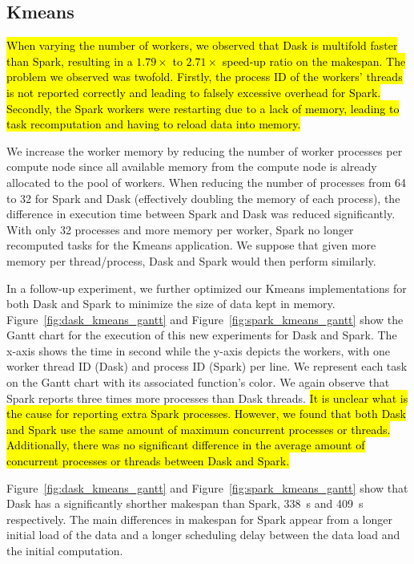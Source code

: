 \documentclass[AMA,STIX1COL]{WileyNJD-v2}
\newcommand{\HL}[1]{\hl{#1}}
\begin{document}
\subsection{Kmeans}
\HL{
	When varying the number of workers, we observed that Dask is multifold faster
	than Spark, resulting in a $1.79\times$ to $2.71\times$ speed-up ratio on the makespan.
	The problem we observed was twofold.
	Firstly, the process ID of the workers' threads is not reported correctly and 
	leading to falsely excessive overhead for Spark.
	Secondly, the Spark workers were restarting due to a lack of memory, leading 
	to task recomputation and having to reload data into memory.
}
							
We increase the worker memory by reducing the number of worker processes per
compute node since all available memory from the compute node is already allocated to the pool of workers.
When reducing the number of processes from 64 to 32 for Spark and Dask 
(effectively doubling the memory of each process), the difference in execution time between Spark and Dask was reduced significantly.
With only 32 processes and more memory per worker, Spark no longer recomputed tasks for the Kmeans application.
We suppose that given more memory per thread/process, Dask and Spark would then perform similarly.
							
In a follow-up experiment, we further optimized our Kmeans implementations for both Dask and Spark to minimize the size of data kept in memory.
Figure~{\ref{fig:dask_kmeans_gantt}} and Figure~{\ref{fig:spark_kmeans_gantt}} show the Gantt chart for the execution
of this new experiments for Dask and Spark.
The x-axis shows the time in second while the y-axis depicts the workers, with 
one worker thread ID (Dask) and process ID (Spark) per line.
We represent each task on the Gantt chart with its associated function's color.
We again observe that Spark reports three times more processes than Dask threads.
\HL{
	It is unclear what is the cause for reporting extra Spark processes.
	However, we found that both Dask and Spark use the same 
	amount of maximum concurrent processes or threads.
	Additionally, there was no significant difference in the average amount of 
	concurrent processes or threads between Dask and Spark.
}
							
Figure~{\ref{fig:dask_kmeans_gantt}} and Figure~{\ref{fig:spark_kmeans_gantt}}
show that Dask has a significantly shorther makespan than Spark, {\SI{338}{\second}}
and {\SI{409}{\second}} respectively.
The main differences in makespan for Spark appear from a longer initial load of the data
and a longer scheduling delay between the data load and the initial computation.
							
\end{document}
